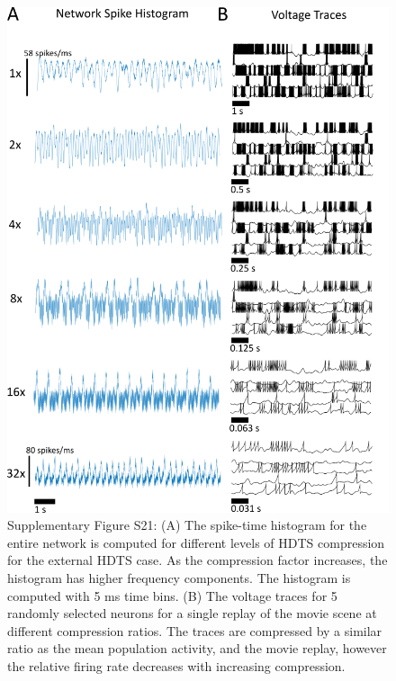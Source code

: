 \documentclass[11pt]{article} %
\begin{document}
\begin{figure}[htp!]
\centering
\includegraphics[scale=0.86]{FFIGS22}
\caption*{Supplementary Figure S21:  (A) The spike-time histogram for the entire network is computed for different levels of HDTS compression for the external HDTS case.  As the compression factor increases, the histogram has higher frequency components.  The histogram is computed with 5 ms time bins.  (B) The voltage traces for 5 randomly selected neurons for a single replay of the movie scene at different compression ratios.  The traces are compressed by a similar ratio as the mean population activity, and the movie replay, however the relative firing rate decreases with increasing compression.} 
\end{figure}
\end{document}
